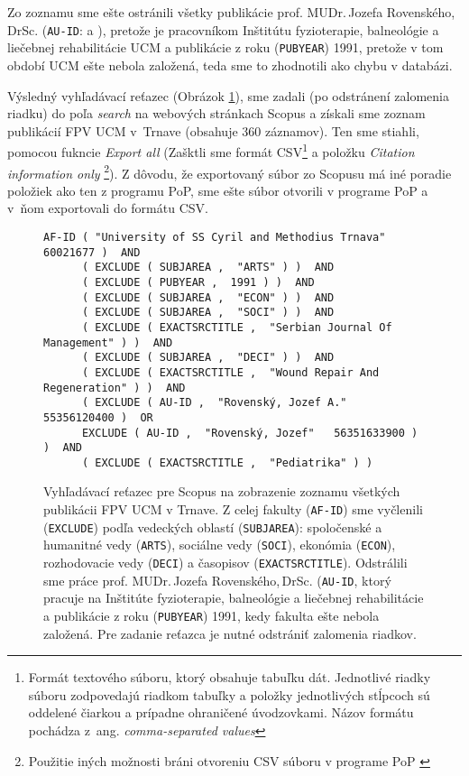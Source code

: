 Zo zoznamu sme ešte ostránili všetky publikácie  prof. MUDr.\,Jozefa
Rovenského,\,DrSc.  (\texttt{AU-ID}:  a ), pretože je pracovníkom Inštitútu fyzioterapie, balneológie a liečebnej
rehabilitácie UCM a publikácie z roku (\texttt{PUBYEAR}) 1991, pretože v tom
období UCM ešte nebola založená, teda sme to zhodnotili ako chybu v databázi.

Výsledný vyhľadávací reťazec (Obrázok \ref{fig:scopus.query}), sme zadali (po
odstránení zalomenia riadku) do poľa \emph{search} na webových stránkach Scopus
a získali sme zoznam publikácií FPV UCM v~Trnave (obsahuje 360 záznamov). Ten
sme stiahli, pomocou fukncie \emph{Export all} (Zašktli sme formát
CSV\footnote{Formát textového súboru, ktorý obsahuje tabuľku dát. Jednotlivé
riadky súboru zodpovedajú riadkom tabuľky a položky jednotlivých stĺpcoch sú
oddelené čiarkou a prípadne ohraničené úvodzovkami.  Názov formátu pochádza
z~ang.  \emph{comma-separated values}} a položku \emph{Citation information
only} \footnote {Použitie iných možnosti bráni otvoreniu CSV súboru v
programe PoP \citep{Harzing2011}}).  Z dôvodu, že exportovaný súbor zo Scopusu má
iné poradie položiek ako ten z programu PoP, sme ešte súbor otvorili v programe
PoP a v~ňom exportovali do formátu CSV.


\begin{figure}
  \footnotesize
  \begin{Verbatim}[frame=single]
    AF-ID ( "University of SS Cyril and Methodius Trnava"   60021677 )  AND
      ( EXCLUDE ( SUBJAREA ,  "ARTS" ) )  AND
      ( EXCLUDE ( PUBYEAR ,  1991 ) )  AND
      ( EXCLUDE ( SUBJAREA ,  "ECON" ) )  AND
      ( EXCLUDE ( SUBJAREA ,  "SOCI" ) )  AND
      ( EXCLUDE ( EXACTSRCTITLE ,  "Serbian Journal Of Management" ) )  AND
      ( EXCLUDE ( SUBJAREA ,  "DECI" ) )  AND
      ( EXCLUDE ( EXACTSRCTITLE ,  "Wound Repair And Regeneration" ) )  AND
      ( EXCLUDE ( AU-ID ,  "Rovenský, Jozef A."   55356120400 )  OR
      EXCLUDE ( AU-ID ,  "Rovenský, Jozef"   56351633900 ) )  AND
      ( EXCLUDE ( EXACTSRCTITLE ,  "Pediatrika" ) )
  \end{Verbatim}
  \vspace*{-4mm}
  \caption[Vyhľahávaci reťazec pre celú fakultu pre Scopus]{Vyhľadávací reťazec
  pre Scopus na zobrazenie zoznamu všetkých publikácii FPV UCM v Trnave.
  Z celej fakulty (\texttt{AF-ID})
  sme vyčlenili (\texttt{EXCLUDE}) podľa vedeckých oblastí (\texttt{SUBJAREA}):
  spoločenské a humanitné vedy (\texttt{ARTS}), sociálne vedy (\texttt{SOCI}),
  ekonómia (\texttt{ECON}), rozhodovacie vedy (\texttt{DECI}) a časopisov
  (\texttt{EXACTSRCTITLE}).  Odstrálili sme práce prof. MUDr.\,Jozefa
  Rovenského,\,DrSc.  (\texttt{AU-ID}, ktorý pracuje na Inštitúte fyzioterapie,
  balneológie a liečebnej rehabilitácie a publikácie z roku (\texttt{PUBYEAR})
  1991, kedy fakulta ešte nebola založená. Pre zadanie reťazca je nutné
  odstrániť zalomenia riadkov.}
  \label{fig:scopus.query}
\end{figure}


